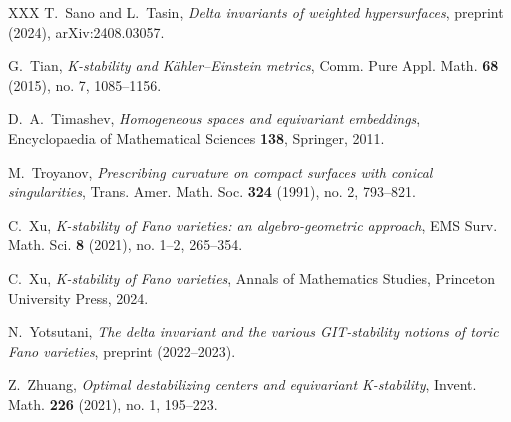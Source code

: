 \documentclass[11pt]{amsart}
\theoremstyle{definition}
\theoremstyle{remark}
\begin{document}
\begin{thebibliography}{XXX}
 T.~Sano and L.~Tasin,
\emph{Delta invariants of weighted hypersurfaces},
preprint (2024), arXiv:2408.03057.

 G.~Tian,
\emph{K-stability and K\"ahler--Einstein metrics},
Comm. Pure Appl. Math. \textbf{68} (2015), no. 7, 1085--1156.

 D.~A.~Timashev,
\emph{Homogeneous spaces and equivariant embeddings},
Encyclopaedia of Mathematical Sciences \textbf{138}, Springer, 2011.

 M.~Troyanov,
\emph{Prescribing curvature on compact surfaces with conical
singularities}, Trans. Amer. Math. Soc. \textbf{324} (1991), no. 2,
793--821.

 C.~Xu,
\emph{K-stability of Fano varieties: an algebro-geometric approach},
EMS Surv. Math. Sci. \textbf{8} (2021), no. 1--2, 265--354.

 C.~Xu,
\emph{K-stability of Fano varieties},
Annals of Mathematics Studies, Princeton University Press, 2024.

 N.~Yotsutani,
\emph{The delta invariant and the various GIT-stability notions of toric
Fano varieties}, preprint (2022--2023).

 Z.~Zhuang,
\emph{Optimal destabilizing centers and equivariant K-stability},
Invent. Math. \textbf{226} (2021), no. 1, 195--223.

\end{thebibliography}
\end{document}
